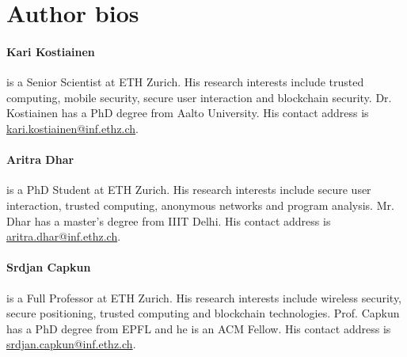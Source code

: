 
\section*{Author bios}

\begin{tcolorbox}

\paragraph{Kari Kostiainen} is a Senior Scientist at ETH Zurich. His research interests include trusted computing, mobile security, secure user interaction and blockchain security. Dr. Kostiainen has a PhD degree from Aalto University. His contact address is \url{kari.kostiainen@inf.ethz.ch}.

\vspace{10pt}
\paragraph{Aritra Dhar} is a PhD Student at ETH Zurich. His research interests include secure user interaction, trusted computing, anonymous networks and program analysis. Mr. Dhar has a master's degree from IIIT Delhi. His contact address is \url{aritra.dhar@inf.ethz.ch}.

\vspace{10pt}
\paragraph{Srdjan Capkun} is a Full Professor at ETH Zurich. His research interests include wireless security, secure positioning, trusted computing and blockchain technologies. Prof. Capkun has a PhD degree from EPFL and he is an ACM Fellow. His contact address is \url{srdjan.capkun@inf.ethz.ch}.

\end{tcolorbox}